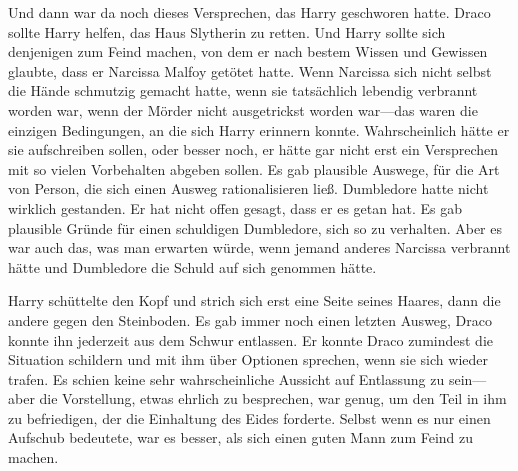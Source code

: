Und dann war da noch dieses Versprechen, das Harry geschworen hatte.
Draco sollte Harry helfen, das Haus Slytherin zu retten. Und Harry sollte sich denjenigen zum Feind machen, von dem er nach bestem Wissen und Gewissen glaubte, dass er Narcissa Malfoy getötet hatte. Wenn Narcissa sich nicht selbst die Hände schmutzig gemacht hatte, wenn sie tatsächlich lebendig verbrannt worden war, wenn der Mörder nicht ausgetrickst worden war—das waren die einzigen Bedingungen, an die sich Harry erinnern konnte. Wahrscheinlich hätte er sie aufschreiben sollen, oder besser noch, er hätte gar nicht erst ein Versprechen mit so vielen Vorbehalten abgeben sollen.
Es gab plausible Auswege, für die Art von Person, die sich einen Ausweg rationalisieren ließ. Dumbledore hatte nicht wirklich gestanden. Er hat nicht offen gesagt, dass er es getan hat. Es gab plausible Gründe für einen schuldigen Dumbledore, sich so zu verhalten. Aber es war auch das, was man erwarten würde, wenn jemand anderes Narcissa verbrannt hätte und Dumbledore die Schuld auf sich genommen hätte.

Harry schüttelte den Kopf und strich sich erst eine Seite seines Haares, dann die andere gegen den Steinboden. Es gab immer noch einen letzten Ausweg, Draco konnte ihn jederzeit aus dem Schwur entlassen. Er konnte Draco zumindest die Situation schildern und mit ihm über Optionen sprechen, wenn sie sich wieder trafen. Es schien keine sehr wahrscheinliche Aussicht auf Entlassung zu sein—aber die Vorstellung, etwas ehrlich zu besprechen, war genug, um den Teil in ihm zu befriedigen, der die Einhaltung des Eides forderte. Selbst wenn es nur einen Aufschub bedeutete, war es besser, als sich einen guten Mann zum Feind zu machen.

